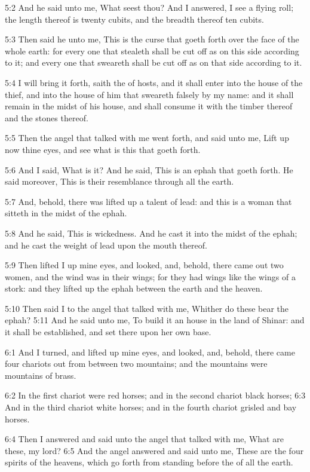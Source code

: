 5:2 And he said unto me, What seest thou? And I answered, I see a
flying roll; the length thereof is twenty cubits, and the breadth
thereof ten cubits.

5:3 Then said he unto me, This is the curse that goeth forth over the
face of the whole earth: for every one that stealeth shall be cut off
as on this side according to it; and every one that sweareth shall be
cut off as on that side according to it.

5:4 I will bring it forth, saith the \LORD of hosts, and it shall enter
into the house of the thief, and into the house of him that sweareth
falsely by my name: and it shall remain in the midst of his house, and
shall consume it with the timber thereof and the stones thereof.

5:5 Then the angel that talked with me went forth, and said unto me,
Lift up now thine eyes, and see what is this that goeth forth.

5:6 And I said, What is it? And he said, This is an ephah that goeth
forth. He said moreover, This is their resemblance through all the
earth.

5:7 And, behold, there was lifted up a talent of lead: and this is a
woman that sitteth in the midst of the ephah.

5:8 And he said, This is wickedness. And he cast it into the midst of
the ephah; and he cast the weight of lead upon the mouth thereof.

5:9 Then lifted I up mine eyes, and looked, and, behold, there came
out two women, and the wind was in their wings; for they had wings
like the wings of a stork: and they lifted up the ephah between the
earth and the heaven.

5:10 Then said I to the angel that talked with me, Whither do these
bear the ephah?  5:11 And he said unto me, To build it an house in the
land of Shinar: and it shall be established, and set there upon her
own base.

6:1 And I turned, and lifted up mine eyes, and looked, and, behold,
there came four chariots out from between two mountains; and the
mountains were mountains of brass.

6:2 In the first chariot were red horses; and in the second chariot
black horses; 6:3 And in the third chariot white horses; and in the
fourth chariot grisled and bay horses.

6:4 Then I answered and said unto the angel that talked with me, What
are these, my lord?  6:5 And the angel answered and said unto me,
These are the four spirits of the heavens, which go forth from
standing before the \LORD of all the earth.

